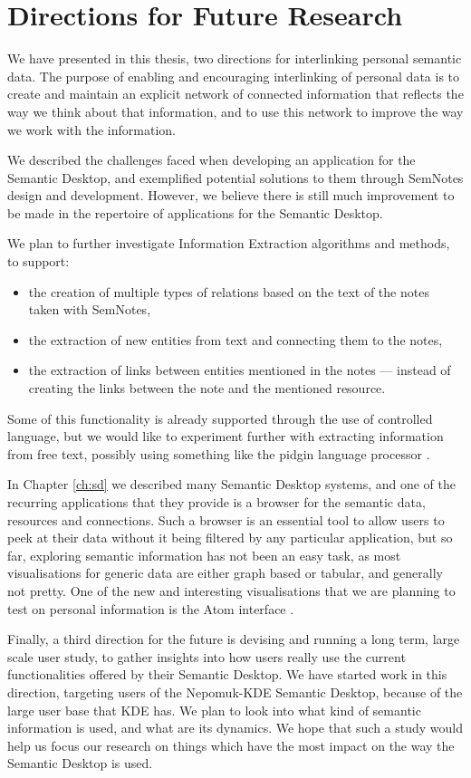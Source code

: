 \section{Directions for Future Research}

We have presented in this thesis, two directions for interlinking personal semantic data. The purpose of enabling and encouraging interlinking of personal data is to create and maintain an explicit network of connected information that reflects the way we think about that information, and to use this network to improve the way we work with the information.

We described the challenges faced when developing an application for the Semantic Desktop, and exemplified potential solutions to them through SemNotes design and development. However, we believe there is still much improvement to be made in the repertoire of applications for the Semantic Desktop. 

We plan to further investigate Information Extraction algorithms and methods, to support:
\begin{itemize}
 \item the creation of multiple types of relations based on the text of the notes taken with SemNotes,
 \item the extraction of new entities from text and connecting them to the notes, 
 \item the extraction of links between entities mentioned in the notes --- instead of creating the links between the note and the mentioned resource. 
\end{itemize}
Some of this functionality is already supported through the use of controlled language, but we would like to experiment further with extracting information from free text, possibly using something like the pidgin language processor \cite{Kleek2007}.

In Chapter \ref{ch:sd} we described many Semantic Desktop systems, and one of the recurring applications that they provide is a browser for the semantic data, resources and connections. Such a browser is an essential tool to allow users to peek at their data without it being filtered by any particular application, but so far, exploring semantic information has not been an easy task, as most visualisations for generic data are either graph based or tabular, and generally not pretty. One of the new and interesting visualisations that we are planning to test on personal information is the Atom interface \cite{Samp2008}.

Finally, a third direction for the future is devising and running a long term, large scale user study, to gather insights into how users really use the current functionalities offered by their Semantic Desktop. We have started work in this direction, targeting users of the Nepomuk-KDE Semantic Desktop, because of the large user base that KDE has. We plan to look into what kind of semantic information is used, and what are its dynamics. We hope that such a study would help us focus our research on things which have the most impact on the way the Semantic Desktop is used.

